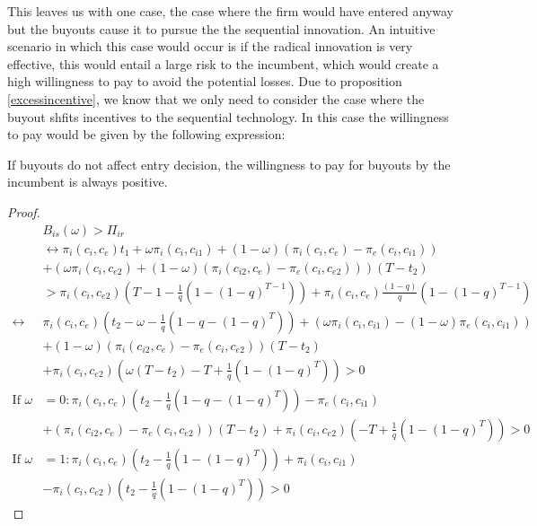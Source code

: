 This leaves us with one case, the case where the firm would have entered anyway but the buyouts cause it to pursue the the sequential innovation. An intuitive scenario in which this case would occur is if the radical innovation is very effective, this would entail a large risk to the incumbent, which would create a high willingness to pay to avoid the potential losses. Due to proposition \ref{excessincentive}, we know that we only need to consider the case where the buyout shfits incentives to the sequential technology. In this case the willingness to pay would be given by the following expression: 
\begin{proposition}
If buyouts do not affect entry decision, the willingness to pay for buyouts by the incumbent is always positive. 
\end{proposition}
\begin{proof}
\begin{align*}
&B_{is}(\omega)>\Pi_{ir}
\\
& \leftrightarrow \pi_i(c_i,c_{e})t_1 
+\omega \pi_i(c_i,c_{i1})+(1-\omega)(\pi_i(c_i,c_{e})-\pi_e(c_i,c_{i1}))
\\&+(\omega \pi_i(c_i,c_{e2})+(1-\omega)(\pi_i(c_{i2},c_e)-\pi_e(c_{i},c_{e2})))(T-t_2)  \\
&> \pi_{i}(c_i,c_{e2}) \left( T-1 - \frac{1}{q} \left( 1-(1-q)^{T-1} \right) \right)
+\pi_i(c_i,c_e) \frac{(1-q)}{q} \left( 1-(1-q)^{T-1} \right) \\
\leftrightarrow &\pi_i(c_i,c_e)(t_2 -\omega-\frac{1}{q} \left( 1-q-(1-q)^{T} \right)) 
+(\omega \pi_i(c_i,c_{i1})-(1-\omega)\pi_e(c_i,c_{i1})) \\
& +(1-\omega)(\pi_i(c_{i2},c_e)-\pi_e(c_{i},c_{e2}))(T-t_2) \\
&+ \pi_i(c_{i},c_{e2})\left(\omega(T-t_2)-T+\frac{1}{q} \left( 1-(1-q)^{T} \right)\right)
> 0 \\
\text{If }\omega &=0: \pi_i(c_i,c_e)(t_2 -\frac{1}{q} \left( 1-q-(1-q)^{T} \right)) 
-\pi_e(c_i,c_{i1})  \\
&+(\pi_i(c_{i2},c_e)-\pi_e(c_{i},c_{e2}))(T-t_2)+ \pi_i(c_{i},c_{e2})\left(-T+\frac{1}{q} \left( 1-(1-q)^{T} \right)\right)
> 0
 \\
\text{If }\omega &=1: \pi_i(c_i,c_e)(t_2 -\frac{1}{q} \left( 1-(1-q)^{T} \right)) 
+\pi_i(c_i,c_{i1})\\
&- \pi_i(c_{i},c_{e2})\left(t_2 - \frac{1}{q} \left( 1-(1-q)^{T} \right)\right)
> 0
\end{align*}


\end{proof}
